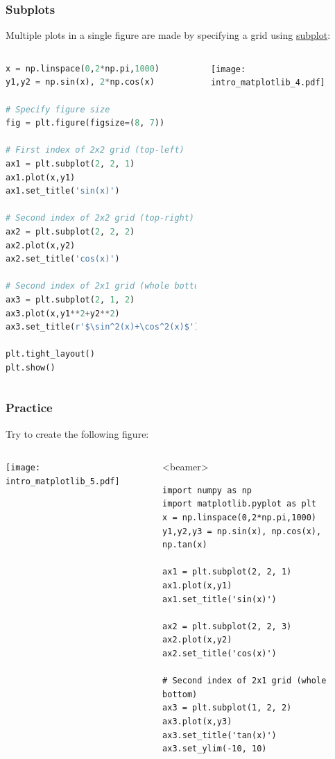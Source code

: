 {\nologo
\begin{frame}[fragile]
  \frametitle{Subplots}
  Multiple plots in a single figure are made by specifying a grid using \href{https://matplotlib.org/stable/api/_as_gen/matplotlib.pyplot.subplot.html#matplotlib-pyplot-subplot}{subplot}:
  \begin{columns}
    \begin{lstlisting}[language=Python]
x = np.linspace(0,2*np.pi,1000)
y1,y2 = np.sin(x), 2*np.cos(x)

# Specify figure size
fig = plt.figure(figsize=(8, 7))

# First index of 2x2 grid (top-left)
ax1 = plt.subplot(2, 2, 1) 
ax1.plot(x,y1)
ax1.set_title('sin(x)')

# Second index of 2x2 grid (top-right)
ax2 = plt.subplot(2, 2, 2) 
ax2.plot(x,y2)
ax2.set_title('cos(x)')

# Second index of 2x1 grid (whole bottom)
ax3 = plt.subplot(2, 1, 2) 
ax3.plot(x,y1**2+y2**2)
ax3.set_title(r'$\sin^2(x)+\cos^2(x)$')

plt.tight_layout()
plt.show()
    \end{lstlisting}\pause
      \texttt{[image: intro\_matplotlib\_4.pdf]}
  \end{columns}
\end{frame}
}

\begin{frame}[fragile,label=practice_subfig]
  \frametitle{Practice}
  Try to create the following figure:
  \begin{columns}
      \texttt{[image: intro\_matplotlib\_5.pdf]}

    \pause
      \begin{onlyenv}<beamer>
        \begin{lstlisting}[]
import numpy as np
import matplotlib.pyplot as plt
x = np.linspace(0,2*np.pi,1000)
y1,y2,y3 = np.sin(x), np.cos(x), np.tan(x)

ax1 = plt.subplot(2, 2, 1) 
ax1.plot(x,y1)
ax1.set_title('sin(x)')

ax2 = plt.subplot(2, 2, 3) 
ax2.plot(x,y2)
ax2.set_title('cos(x)')

# Second index of 2x1 grid (whole bottom)
ax3 = plt.subplot(1, 2, 2) 
ax3.plot(x,y3)
ax3.set_title('tan(x)')
ax3.set_ylim(-10, 10)
        \end{lstlisting}
      \end{onlyenv}
  \end{columns}
\end{frame}

